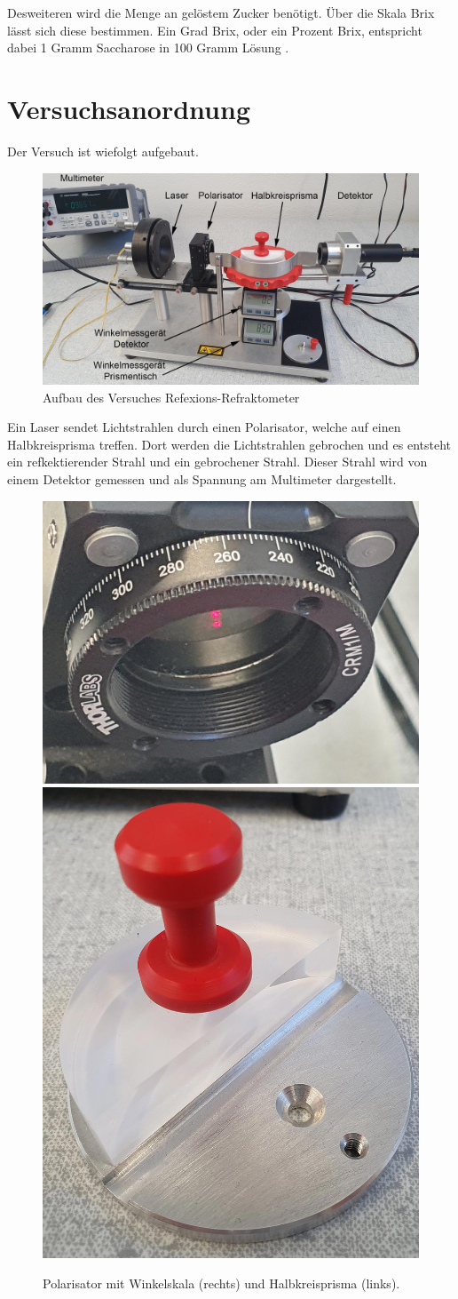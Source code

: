 \documentclass[12pt,a4paper,twoside]{article}
\begin{document}
\noindent
Desweiteren wird die Menge an gelöstem Zucker benötigt. Über die Skala Brix lässt sich diese bestimmen. 
Ein Grad Brix, oder ein Prozent Brix, entspricht dabei 1 Gramm Saccharose in 100 Gramm Lösung \cite{Brix}.

\section{Versuchsanordnung} %
Der Versuch ist wiefolgt aufgebaut. 

\begin{figure}[H]
    \centering
    \includegraphics[width=0.7\linewidth]{nudes/Aufbau.jpg}
    \caption{Aufbau des Versuches Refexions-Refraktometer}
    \label{fig:aufbau}
\end{figure}

\noindent
Ein Laser sendet Lichtstrahlen durch einen Polarisator, welche auf einen Halbkreisprisma treffen. Dort werden die Lichtstrahlen gebrochen und es entsteht ein refkektierender Strahl und ein gebrochener Strahl. 
Dieser Strahl wird von einem Detektor gemessen und als Spannung am Multimeter dargestellt. 

\begin{figure}[H]
    \centering
    \includegraphics[width=0.4\linewidth]{nudes/Polarisator.jpg}
    \includegraphics[width=0.4\linewidth]{nudes/halbkreisprisma.jpg}
    \caption{Polarisator mit Winkelskala (rechts) und Halbkreisprisma (links). }
    \label{fig:Polarisator und prisma}
\end{figure}
\end{document}
